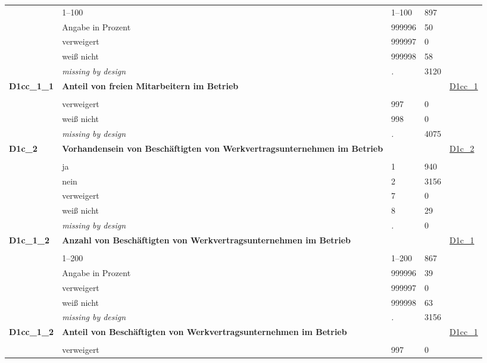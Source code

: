 \begin{longtable}{| L{2.65cm} | L{8cm} | C{1.5cm} | R{1.25cm} | C{2.25cm}  |}
   & 1--100 & 1--100 & 897 &  \\ 
   & Angabe in Prozent & 999996 & 50 &  \\ 
   & verweigert & 999997 & 0 &  \\ 
   & weiß nicht & 999998 & 58 &  \\ 
   & \textit{missing by design} & \textit{.} & 3120 &  \\ 
   \midrule
\textbf{D1cc\_1\_1}\label{var:D1cc:1:1} & \textbf{Anteil von freien Mitarbeitern im Betrieb} &  &  & \hyperref[D1cc:1]{D1cc\_1} \\ 
   &  &  &  &  \\ 
   & verweigert & 997 & 0 &  \\ 
   & weiß nicht & 998 & 0 &  \\ 
   & \textit{missing by design} & \textit{.} & 4075 &  \\ 
   \midrule
\textbf{D1c\_2}\label{var:D1c:2} & \textbf{Vorhandensein von Beschäftigten von Werkvertragsunternehmen im Betrieb} &  &  & \hyperref[D1c:2]{D1c\_2} \\ 
   &  &  &  &  \\ 
   & ja & 1 & 940 &  \\ 
   & nein & 2 & 3156 &  \\ 
   & verweigert & 7 & 0 &  \\ 
   & weiß nicht & 8 & 29 &  \\ 
   & \textit{missing by design} & \textit{.} & 0 &  \\ 
   \midrule
\textbf{D1c\_1\_2}\label{var:D1c:1:2} & \textbf{Anzahl von Beschäftigten von Werkvertragsunternehmen im Betrieb} &  &  & \hyperref[D1c:1]{D1c\_1} \\ 
   &  &  &  &  \\ 
   & 1--200 & 1--200 & 867 &  \\ 
   & Angabe in Prozent & 999996 & 39 &  \\ 
   & verweigert & 999997 & 0 &  \\ 
   & weiß nicht & 999998 & 63 &  \\ 
   & \textit{missing by design} & \textit{.} & 3156 &  \\ 
   \midrule
\textbf{D1cc\_1\_2}\label{var:D1cc:1:2} & \textbf{Anteil von Beschäftigten von Werkvertragsunternehmen im Betrieb} &  &  & \hyperref[D1cc:1]{D1cc\_1} \\ 
   &  &  &  &  \\ 
   & verweigert & 997 & 0 &  \\ 

\end{longtable}
